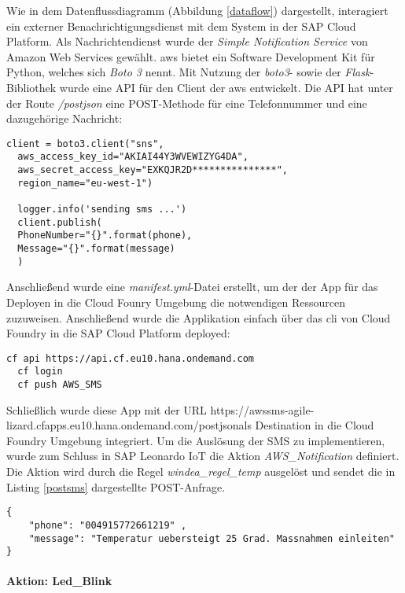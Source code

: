 Wie in dem Datenflussdiagramm (Abbildung \ref{dataflow}) dargestellt, interagiert ein externer Benachrichtigungsdienst mit dem System in der SAP Cloud Platform. Als Nachrichtendienst wurde der \textit{Simple Notification Service} von Amazon Web Services gewählt. \ac{aws} bietet ein Software Development Kit für Python, welches sich \textit{Boto 3} nennt. Mit Nutzung der \textit{boto3}- sowie der \textit{Flask}-Bibliothek wurde eine API für den Client der \ac{aws} entwickelt. Die API hat unter der Route \textit{/postjson} eine POST-Methode für eine Telefonnummer und eine dazugehörige Nachricht:
\begin{lstlisting}[caption= Flask-API für AWS SNS]
  client = boto3.client("sns",
  aws_access_key_id="AKIAI44Y3WVEWIZYG4DA",
  aws_secret_access_key="EXKQJR2D***************",
  region_name="eu-west-1")

  logger.info('sending sms ...')
  client.publish(
  PhoneNumber="{}".format(phone),
  Message="{}".format(message)
  )
\end{lstlisting}

Anschließend wurde eine \textit{manifest.yml}-Datei erstellt, um der der App für das Deployen in die Cloud Founry Umgebung die notwendigen Ressourcen zuzuweisen. Anschließend wurde die Applikation einfach über das \ac{cli} von Cloud Foundry in die SAP Cloud Platform deployed:
\begin{lstlisting}[caption= Deployment in die SAP Cloud Platform]
  cf api https://api.cf.eu10.hana.ondemand.com
  cf login
  cf push AWS_SMS
\end{lstlisting}

\noindent Schließlich wurde diese App mit der URL https://awssms-agile-lizard.cfapps.eu10.hana.ondemand.com/postjsonals Destination in die Cloud Foundry Umgebung integriert. Um die Auslösung der SMS zu implementieren, wurde zum Schluss in SAP Leonardo IoT die Aktion \textit{AWS\_Notification} definiert. Die Aktion wird durch die Regel \textit{windea\_regel\_temp} ausgelöst und sendet die in Listing \ref{postsms} dargestellte POST-Anfrage.

\begin{lstlisting}[caption=JSON Payload, label=postsms]
  {
    "phone": "004915772661219" ,
    "message": "Temperatur uebersteigt 25 Grad. Massnahmen einleiten"
}
\end{lstlisting}

\paragraph{Aktion: Led\_Blink}

